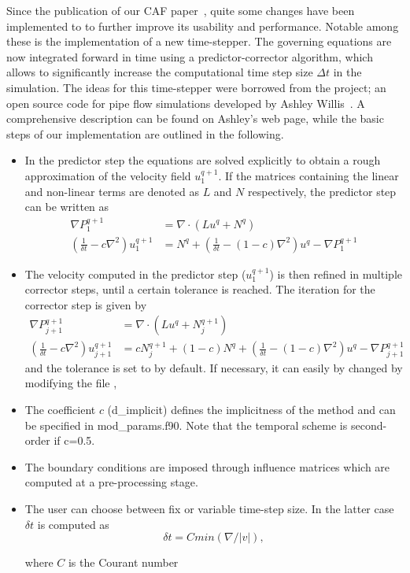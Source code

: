 \documentclass[a4paper, 11pt, DIV=11]{scrartcl}
\begin{document}
Since the publication of our CAF paper~\cite{Shi2015}, quite some changes have been
implemented to \nsc to further improve its usability and performance. Notable among
these is the implementation of a new time-stepper. The governing equations are now
integrated forward in time using a predictor-corrector algorithm, which allows to
significantly increase the computational time step size $\Delta t$ in the simulation.
The ideas for this time-stepper were borrowed from the \opf project; an open source
code for pipe flow simulations developed by Ashley Willis~\cite{Willis2017}. A
comprehensive description can be found on Ashley's web page, while the basic steps
of our implementation are outlined in the following.
\begin{itemize}

\item
In the predictor step the equations are solved explicitly to obtain a rough
approximation of the velocity field $u_1^{q+1}$. If the matrices containing
the linear and non-linear terms are denoted as $L$ and $N$ respectively, the
predictor step can be written as
\begin{align*}
\nabla P_1^{q+1} & = \nabla\cdot(Lu^q+N^q)\\
\left(\frac{1}{\delta t} - c\nabla^2\right) u_1^{q+1} & =
N^q + \left(\frac{1}{\delta t}-(1-c)\nabla^2\right) u^{q} - \nabla P_1^{q+1}
\end{align*}

\item
The velocity computed in the predictor step ($u_1^{q+1}$) is then refined in
multiple corrector steps, until a certain tolerance is reached. The iteration
for the corrector step is given by
\begin{align*}
\nabla P_{j+1}^{q+1} & = \nabla\cdot\left(Lu^q+N_j^{q+1}\right)\\
\left(\frac{1}{\delta t}-c \nabla^2\right) u_{j+1}^{q+1} & =
c N_j^{q+1} + \left(1-c\right)N^q + \left( \frac{1}{\delta t} -
\left(1-c \right) \nabla^2 \right) u^{q} - \nabla P_{j+1}^{q+1}
\end{align*}
and the tolerance is set to  by default. If
necessary, it can easily by changed by modifying the file ,

  
\item The coefficient $c$ (d\_implicit) defines the implicitness of the method and can be specified
  in mod\_params.f90. Note that the temporal scheme is second-order if c=0.5.

\item The boundary conditions are imposed through influence matrices which are 
  computed at a pre-processing stage.


  \item The user can choose between fix or variable time-step size. In the latter case $\delta t$ is computed as
  \begin{equation}
 \delta t = C min (\nabla / |v|),
  \end{equation}
  
  where $C$ is the Courant number
  

\end{itemize}
\end{document}
